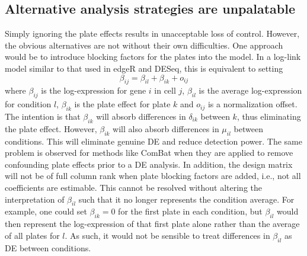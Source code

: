 \documentclass{article}
\begin{document}
\subsection{Alternative analysis strategies are unpalatable}
Simply ignoring the plate effects results in unacceptable loss of control.
However, the obvious alternatives are not without their own difficulties.
One approach would be to introduce blocking factors for the plates into the model.
In a log-link model similar to that used in edgeR and DESeq, this is equivalent to setting
\[
    \beta_{ij} = \beta_{il} + \beta_{ik} + o_{ij}
\]
where $\beta_{ij}$ is the log-expression for gene $i$ in cell $j$, $\beta_{il}$ is the average log-expression for condition $l$, 
    $\beta_{ik}$ is the plate effect for plate $k$ and $o_{ij}$ is a normalization offset.
The intention is that $\beta_{ik}$ will absorb differences in $\delta_{ik}$ between $k$, thus eliminating the plate effect.
However, $\beta_{ik}$ will also absorb differences in $\mu_{il}$ between conditions.
This will eliminate genuine DE and reduce detection power.
The same problem is observed for methods like ComBat \cite{johnson2007adjusting} when they are applied to remove confounding plate effects prior to a DE analysis.
In addition, the design matrix will not be of full column rank when plate blocking factors are added, i.e., not all coefficients are estimable.
This cannot be resolved without altering the interpretation of $\beta_{il}$ such that it no longer represents the condition average.
For example, one could set $\beta_{ik}=0$ for the first plate in each condition, 
    but $\beta_{il}$ would then represent the log-expression of that first plate alone rather than the average of all plates for $l$.
As such, it would not be sensible to treat differences in $\beta_{il}$ as DE between conditions.
\end{document}
